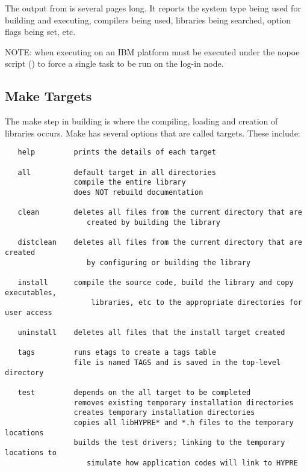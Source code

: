 The output from  is several pages long.  It reports the system type 
being used for building and executing, compilers being used, libraries being searched,
option flags being set, etc.  


NOTE: when executing on an IBM platform  must be executed under 
the nopoe script () to force a single 
task to be run on the log-in node.


\subsection{Make Targets}

The make step in building \hypre{} is where the compiling, loading and creation 
of libraries occurs.  Make has several options that are called targets.  These include:
\begin{verbatim}
   help         prints the details of each target

   all          default target in all directories
                compile the entire library
                does NOT rebuild documentation

   clean        deletes all files from the current directory that are 
                   created by building the library

   distclean    deletes all files from the current directory that are created
                   by configuring or building the library

   install      compile the source code, build the library and copy executables,
                    libraries, etc to the appropriate directories for user access

   uninstall    deletes all files that the install target created

   tags         runs etags to create a tags table
                file is named TAGS and is saved in the top-level directory

   test         depends on the all target to be completed
                removes existing temporary installation directories
                creates temporary installation directories
                copies all libHYPRE* and *.h files to the temporary locations
                builds the test drivers; linking to the temporary locations to
                   simulate how application codes will link to HYPRE
\end{verbatim}


